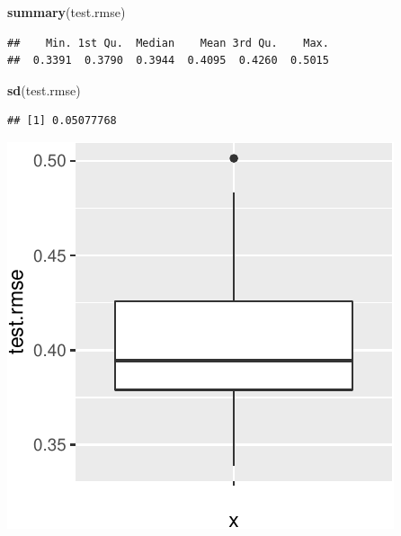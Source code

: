 \documentclass[]{article}
\newenvironment{Shaded}{\begin{snugshade}}{\end{snugshade}}
\newcommand{\KeywordTok}[1]{\textcolor[rgb]{0.13,0.29,0.53}{\textbf{#1}}}
\newcommand{\DataTypeTok}[1]{\textcolor[rgb]{0.13,0.29,0.53}{#1}}
\newcommand{\StringTok}[1]{\textcolor[rgb]{0.31,0.60,0.02}{#1}}
\newcommand{\OperatorTok}[1]{\textcolor[rgb]{0.81,0.36,0.00}{\textbf{#1}}}
\newcommand{\NormalTok}[1]{#1}
\begin{document}
\begin{Shaded}
\begin{Highlighting}[]
\KeywordTok{summary}\NormalTok{(test.rmse)}
\end{Highlighting}
\end{Shaded}

\begin{verbatim}
##    Min. 1st Qu.  Median    Mean 3rd Qu.    Max. 
##  0.3391  0.3790  0.3944  0.4095  0.4260  0.5015
\end{verbatim}

\begin{Shaded}
\begin{Highlighting}[]
\KeywordTok{sd}\NormalTok{(test.rmse)}
\end{Highlighting}
\end{Shaded}

\begin{verbatim}
## [1] 0.05077768
\end{verbatim}

\begin{Shaded}
\end{Shaded}

\begin{center}\includegraphics{kfold_supplement_files/figure-latex/unnamed-chunk-10-1} \end{center}
\end{document}
